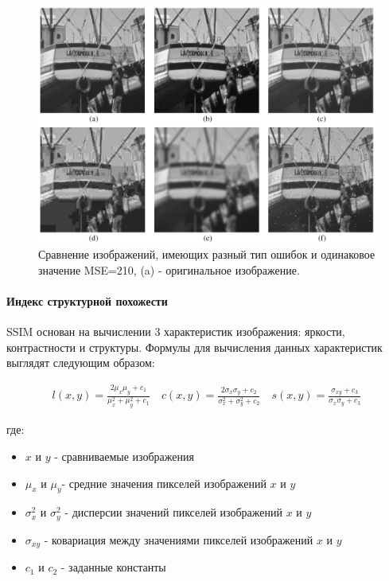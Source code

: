 
\begin{figure}[H]
    \centering
    \includegraphics[width=\linewidth]{assets/boat_same_mse.png}
    \caption{ Сравнение изображений, имеющих разный тип ошибок и одинаковое
    значение MSE=210, (a) - оригинальное изображение\cite{SSIMArticle}. }
    \label{img:boat_same_mse}
\end{figure}


\paragraph{Индекс структурной похожести}

SSIM основан на вычислении 3 характеристик изображения: яркости, контрастности и
структуры. Формулы для вычисления данных характеристик выглядят следующим
образом:

\begin{gather} \label{eq:ssim_components}
    l\left(x, y\right) = \frac{
        2\mu_{x}\mu_{y} + c_{1}
    }{
        \mu_{x}^{2} + \mu_{y}^{2} + c_{1}
    } \quad
    c\left(x, y\right) = \frac{
        2\sigma_{x}\sigma_{y} + c_{2}
    }{
        \sigma_{x}^{2} + \sigma_{y}^{2} + c_{2}
    } \quad
    s\left(x, y\right) = \frac{
        \sigma_{xy} + c_{3}
    }{
        \sigma_{x} \sigma_{y} + c_{3}
    }
\end{gather}

\noindent где:

\begin{itemize}
    \item $x$ и $y$ - сравниваемые изображения
    \item $\mu_{x}$ и $\mu_{y}$​ - средние значения пикселей изображений $x$ и
    $y$
    \item $\sigma_{x}^{2}$ и $\sigma_{y}^{2}$ - дисперсии значений пикселей
    изображений $x$ и $y$
    \item $\sigma_{xy}$ - ковариация между значениями пикселей изображений $x$ и
    $y$
    \item $c_{1}$ и $c_{2}$ - заданные константы
\end{itemize}

